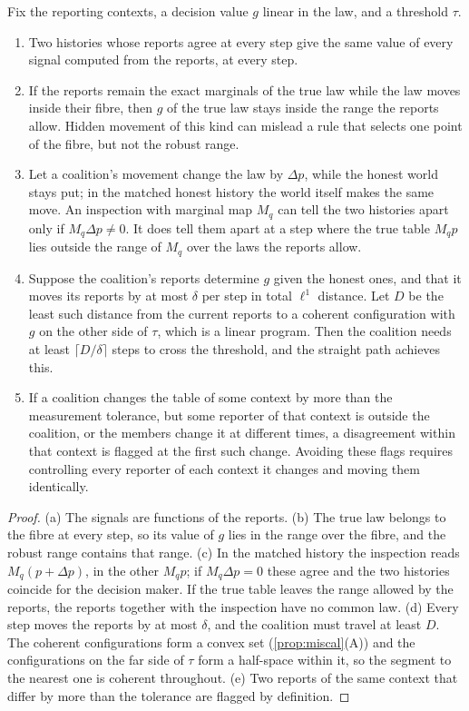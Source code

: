 \documentclass[11pt]{article}
\theoremstyle{definition}\newtheorem{definition}[theorem]{Definition}\newtheorem{remark}[theorem]{Remark}\newtheorem{example}[theorem]{Example}\newtheorem{problem}[theorem]{Open problem}\crefname{problem}{Problem}{Problems}
\begin{document}
\begin{proposition}\label{prop:watch}
Fix the reporting contexts, a decision value $g$ linear in the law, and a threshold $\tau$.
\begin{enumerate}
\item[(a)] Two histories whose reports agree at every step give the same value of every signal computed from the reports, at every step.
\item[(b)] If the reports remain the exact marginals of the true law while the law moves inside their fibre, then $g$ of the true law stays inside the range the reports allow. Hidden movement of this kind can mislead a rule that selects one point of the fibre, but not the robust range.
\item[(c)] Let a coalition's movement change the law by $\Delta p$, while the honest world stays put; in the matched honest history the world itself makes the same move. An inspection with marginal map $M_q$ can tell the two histories apart only if $M_q\Delta p\neq0$. It does tell them apart at a step where the true table $M_qp$ lies outside the range of $M_q$ over the laws the reports allow.
\item[(d)] Suppose the coalition's reports determine $g$ given the honest ones, and that it moves its reports by at most $\delta$ per step in total $\ell^1$ distance. Let $D$ be the least such distance from the current reports to a coherent configuration with $g$ on the other side of $\tau$, which is a linear program. Then the coalition needs at least $\lceil D/\delta\rceil$ steps to cross the threshold, and the straight path achieves this.
\item[(e)] If a coalition changes the table of some context by more than the measurement tolerance, but some reporter of that context is outside the coalition, or the members change it at different times, a disagreement within that context is flagged at the first such change. Avoiding these flags requires controlling every reporter of each context it changes and moving them identically.
\end{enumerate}
\end{proposition}

\begin{proof}
(a) The signals are functions of the reports. (b) The true law belongs to the fibre at every step, so its value of $g$ lies in the range over the fibre, and the robust range contains that range. (c) In the matched history the inspection reads $M_q(p+\Delta p)$, in the other $M_qp$; if $M_q\Delta p=0$ these agree and the two histories coincide for the decision maker. If the true table leaves the range allowed by the reports, the reports together with the inspection have no common law. (d) Every step moves the reports by at most $\delta$, and the coalition must travel at least $D$. The coherent configurations form a convex set (\cref{prop:miscal}(A)) and the configurations on the far side of $\tau$ form a half-space within it, so the segment to the nearest one is coherent throughout. (e) Two reports of the same context that differ by more than the tolerance are flagged by definition.
\end{proof}
\end{document}
